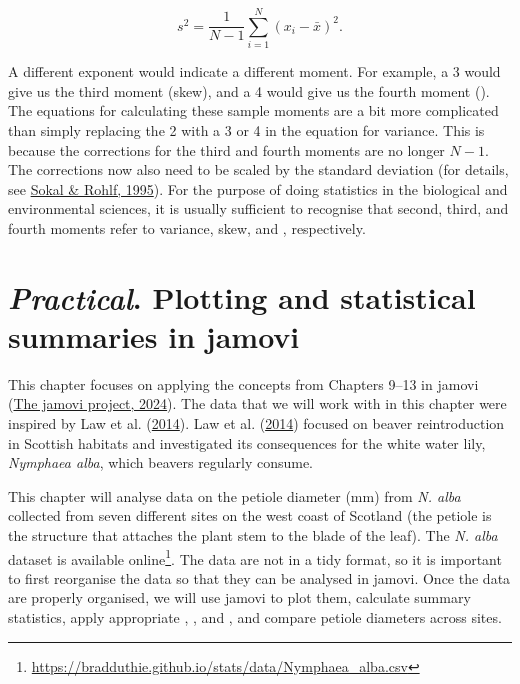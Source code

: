 \documentclass[
  openany]{krantz}
\begin{document}
\[s^{2} = \frac{1}{N - 1}\sum_{i = 1}^{N}\left(x_{i} - \bar{x} \right)^{2}.\]

A different exponent would indicate a different moment.
For example, a 3 would give us the third moment (skew), and a 4 would give us the fourth moment ().
The equations for calculating these sample moments are a bit more complicated than simply replacing the 2 with a 3 or 4 in the equation for variance.
This is because the corrections for the third and fourth moments are no longer \(N - 1\).
The corrections now also need to be scaled by the standard deviation (for details, see \protect\hyperlink{ref-Sokal1995}{Sokal \& Rohlf, 1995}).
For the purpose of doing statistics in the biological and environmental sciences, it is usually sufficient to recognise that second, third, and fourth moments refer to variance, skew, and , respectively.

\hypertarget{Chapter_14}{%
\chapter{\texorpdfstring{\emph{Practical}. Plotting and statistical summaries in jamovi}{Practical. Plotting and statistical summaries in jamovi}}\label{Chapter_14}}

This chapter focuses on applying the concepts from Chapters 9--13 in jamovi (\protect\hyperlink{ref-Jamovi2022}{The jamovi project, 2024}).
The data that we will work with in this chapter were inspired by Law et al. (\protect\hyperlink{ref-Law2014}{2014}).
Law et al. (\protect\hyperlink{ref-Law2014}{2014}) focused on beaver reintroduction in Scottish habitats and investigated its consequences for the white water lily, \emph{Nymphaea alba}, which beavers regularly consume.

This chapter will analyse data on the petiole diameter (mm) from \emph{N. alba} collected from seven different sites on the west coast of Scotland (the petiole is the structure that attaches the plant stem to the blade of the leaf).
The \emph{N. alba} dataset is available online\footnote{\url{https://bradduthie.github.io/stats/data/Nymphaea_alba.csv}}.
The data are not in a tidy format, so it is important to first reorganise the data so that they can be analysed in jamovi.
Once the data are properly organised, we will use jamovi to plot them, calculate summary statistics, apply appropriate , , and , and compare petiole diameters across sites.
\end{document}
